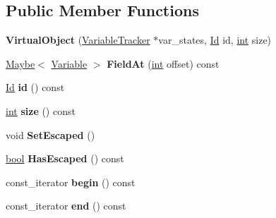 \subsection*{Public Member Functions}
\begin{DoxyCompactItemize}
\item 
\mbox{\label{classv8_1_1internal_1_1compiler_1_1VirtualObject_a9c0201bed46121ffa2f566fe3a6bea25}} 
{\bfseries Virtual\+Object} (\mbox{\hyperlink{classv8_1_1internal_1_1compiler_1_1VariableTracker}{Variable\+Tracker}} $\ast$var\+\_\+states, \mbox{\hyperlink{classuint32__t}{Id}} id, \mbox{\hyperlink{classint}{int}} size)
\item 
\mbox{\label{classv8_1_1internal_1_1compiler_1_1VirtualObject_aef2dfb2186257939cbaa835295616149}} 
\mbox{\hyperlink{classv8_1_1Maybe}{Maybe}}$<$ \mbox{\hyperlink{classv8_1_1internal_1_1compiler_1_1Variable}{Variable}} $>$ {\bfseries Field\+At} (\mbox{\hyperlink{classint}{int}} offset) const
\item 
\mbox{\label{classv8_1_1internal_1_1compiler_1_1VirtualObject_a6007fffefc40ade4a21fe28551ec139d}} 
\mbox{\hyperlink{classuint32__t}{Id}} {\bfseries id} () const
\item 
\mbox{\label{classv8_1_1internal_1_1compiler_1_1VirtualObject_ae6e7742c262de7d435686c9ee19a8b91}} 
\mbox{\hyperlink{classint}{int}} {\bfseries size} () const
\item 
\mbox{\label{classv8_1_1internal_1_1compiler_1_1VirtualObject_a9349ef14745ee74f35f7900283fcd22d}} 
void {\bfseries Set\+Escaped} ()
\item 
\mbox{\label{classv8_1_1internal_1_1compiler_1_1VirtualObject_a9ff32488db4159528f1fb5cf6ec9d002}} 
\mbox{\hyperlink{classbool}{bool}} {\bfseries Has\+Escaped} () const
\item 
\mbox{\label{classv8_1_1internal_1_1compiler_1_1VirtualObject_a6f2a21d1ddb8004e9286644c87725a07}} 
const\+\_\+iterator {\bfseries begin} () const
\item 
\mbox{\label{classv8_1_1internal_1_1compiler_1_1VirtualObject_adf300f881e38edee1706f31f389362a2}} 
const\+\_\+iterator {\bfseries end} () const
\end{DoxyCompactItemize}


